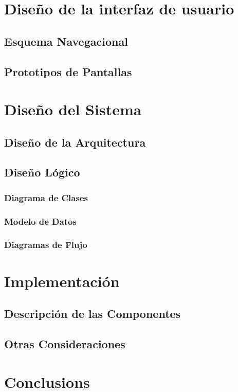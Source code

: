 \documentclass[12pt]{article}
\begin{document}
\newpage
\section{Dise\~no de la interfaz de usuario}
\subsection{Esquema Navegacional}
\subsection{Prototipos de Pantallas}

\newpage
\section{Dise\~no del Sistema}
\subsection{Dise\~no de la Arquitectura}
\subsection{Dise\~no Lógico}
\subsubsection{Diagrama de Clases}
\subsubsection{Modelo de Datos}
\subsubsection{Diagramas de Flujo}

\newpage
\section{Implementación}
\subsection{Descripción de las Componentes}
\subsection{Otras Consideraciones}

\section{Conclusions}\label{conclusions}


\newpage

%
\end{document}
